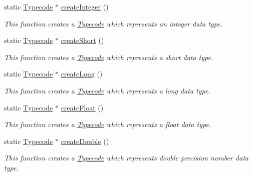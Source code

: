 \begin{DoxyCompactItemize}
\item 
static \hyperlink{class_dynamic_fast_buffers_1_1_typecode}{Typecode} $\ast$ \hyperlink{class_dynamic_fast_buffers_1_1_typecode_a_p_i_a26e65e48124e2dd45c822c63b60d1ae4}{create\-Integer} ()
\begin{DoxyCompactList}\small\item\em This function creates a \hyperlink{class_dynamic_fast_buffers_1_1_typecode}{Typecode} which represents an integer data type. \end{DoxyCompactList}\item 
static \hyperlink{class_dynamic_fast_buffers_1_1_typecode}{Typecode} $\ast$ \hyperlink{class_dynamic_fast_buffers_1_1_typecode_a_p_i_a7ff40b38d9b0e2aec26a2417fa4163a8}{create\-Short} ()
\begin{DoxyCompactList}\small\item\em This function creates a \hyperlink{class_dynamic_fast_buffers_1_1_typecode}{Typecode} which represents a short data type. \end{DoxyCompactList}\item 
static \hyperlink{class_dynamic_fast_buffers_1_1_typecode}{Typecode} $\ast$ \hyperlink{class_dynamic_fast_buffers_1_1_typecode_a_p_i_a6782f497eecdb61b858bbb37995a22dc}{create\-Long} ()
\begin{DoxyCompactList}\small\item\em This function creates a \hyperlink{class_dynamic_fast_buffers_1_1_typecode}{Typecode} which represents a long data type. \end{DoxyCompactList}\item 
static \hyperlink{class_dynamic_fast_buffers_1_1_typecode}{Typecode} $\ast$ \hyperlink{class_dynamic_fast_buffers_1_1_typecode_a_p_i_ada50fc65b7bb9b94b3ab5e67291775c9}{create\-Float} ()
\begin{DoxyCompactList}\small\item\em This function creates a \hyperlink{class_dynamic_fast_buffers_1_1_typecode}{Typecode} which represents a float data type. \end{DoxyCompactList}\item 
static \hyperlink{class_dynamic_fast_buffers_1_1_typecode}{Typecode} $\ast$ \hyperlink{class_dynamic_fast_buffers_1_1_typecode_a_p_i_aa47cfd35c3780abdb510e7db7c5f6ad9}{create\-Double} ()
\begin{DoxyCompactList}\small\item\em This function creates a \hyperlink{class_dynamic_fast_buffers_1_1_typecode}{Typecode} which represents double precision number data type. \end{DoxyCompactList}\item 

\end{DoxyCompactItemize}
